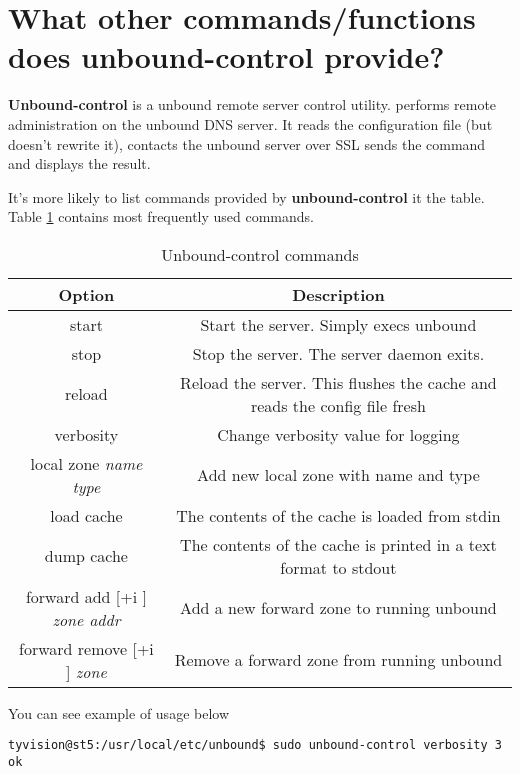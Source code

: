 \documentclass[a4paper]{article}
\begin{document}
\section{What other commands/functions does unbound-control provide?}
\textbf{Unbound-control} is a unbound remote server control utility.  performs remote administration on the unbound DNS server. It reads the configuration file (but doesn't rewrite it), contacts the unbound server over SSL sends the command and displays the result. 

It's more likely to list commands provided by \textbf{unbound-control} it the table. Table \ref{table:unbound_ctrl_cmds} contains most frequently used commands.

\begin{table}[h!]
\begin{center}
  \begin{tabular}{| c | c |}
  \hline
    \textbf{Option} & \textbf{Description}\\
    \hline
	start & Start  the  server.  Simply  execs unbound\\ \hline
	stop & Stop the server. The server daemon exits. \\ \hline
	reload & Reload the server. This flushes the cache and reads  the  config
              file fresh \\ \hline
	verbosity & Change  verbosity  value  for  logging \\ \hline
	local zone \textit{name type} & Add new local zone with name and type \\ \hline
	load cache &  The contents of the cache is loaded from stdin \\ \hline
	dump cache & The contents of the cache is printed in a text format to stdout\\ \hline
	forward add [+i ] \textit{zone addr} & Add a new forward zone to running unbound\\ \hline
 	forward remove [+i ] \textit{zone} & Remove a forward zone from running unbound\\ \hline
	\end{tabular}
	\caption{Unbound-control commands}
\label{table:unbound_ctrl_cmds}
\end{center}
\end{table}

You can see example of usage below
\begin{verbatim}
tyvision@st5:/usr/local/etc/unbound$ sudo unbound-control verbosity 3
ok
\end{verbatim}
\end{document}
